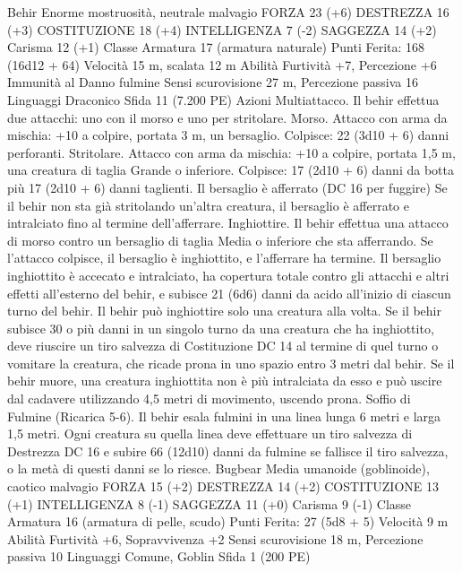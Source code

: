 \begin{multicols}{2}
Behir
Enorme mostruosità, neutrale malvagio
FORZA 23 (+6)
DESTREZZA 16 (+3)
COSTITUZIONE 18 (+4)
INTELLIGENZA 7 (-2)
SAGGEZZA 14 (+2)
Carisma 12 (+1)
Classe Armatura 17 (armatura naturale)
\hspace*{0pt}\hfill{Punti Ferita}: 168 (16d12 + 64)
Velocità 15 m, scalata 12 m
Abilità Furtività +7, Percezione +6
Immunità al Danno fulmine
Sensi scurovisione 27 m, Percezione passiva 16
Linguaggi Draconico
Sfida 11 (7.200 PE)
Azioni
Multiattacco. Il behir effettua due attacchi: uno con il morso e
uno per stritolare.
Morso. Attacco con arma da mischia: +10 a colpire, portata 3 m,
un bersaglio.
Colpisce: 22 (3d10 + 6) danni perforanti.
Stritolare. Attacco con arma da mischia: +10 a colpire, portata
1,5 m, una creatura di taglia Grande o inferiore.
Colpisce: 17 (2d10 + 6) danni da botta più 17 (2d10 + 6)
danni taglienti. Il bersaglio è afferrato (DC 16 per fuggire) Se il
behir non sta già stritolando un’altra creatura, il bersaglio è
afferrato e intralciato fino al termine dell’afferrare.
Inghiottire. Il behir effettua una attacco di morso contro un
bersaglio di taglia Media o inferiore che sta afferrando. Se
l’attacco colpisce, il bersaglio è inghiottito, e l’afferrare ha
termine. Il bersaglio inghiottito è accecato e intralciato, ha
copertura totale contro gli attacchi e altri effetti all’esterno del
behir, e subisce 21 (6d6) danni da acido all’inizio di ciascun
turno del behir. Il behir può inghiottire solo una creatura alla
volta.
Se il behir subisce 30 o più danni in un singolo turno da una
creatura che ha inghiottito, deve riuscire un tiro salvezza di
Costituzione DC 14 al termine di quel turno o vomitare la
creatura, che ricade prona in uno spazio entro 3 metri dal behir.
Se il behir muore, una creatura inghiottita non è più intralciata da
esso e può uscire dal cadavere utilizzando 4,5 metri di
movimento, uscendo prona.
Soffio di Fulmine (Ricarica 5-6). Il behir esala fulmini in una
linea lunga 6 metri e larga 1,5 metri. Ogni creatura su quella
linea deve effettuare un tiro salvezza di Destrezza DC 16 e subire
66 (12d10) danni da fulmine se fallisce il tiro salvezza, o la metà
di questi danni se lo riesce.
Bugbear
Media umanoide (goblinoide), caotico malvagio
FORZA 15 (+2)
DESTREZZA 14 (+2)
COSTITUZIONE 13 (+1)
INTELLIGENZA 8 (-1)
SAGGEZZA 11 (+0)
Carisma 9 (-1)
Classe Armatura 16 (armatura di pelle, scudo)
\hspace*{0pt}\hfill{Punti Ferita}: 27 (5d8 + 5)
Velocità 9 m
Abilità Furtività +6, Sopravvivenza +2
Sensi scurovisione 18 m, Percezione passiva 10
Linguaggi Comune, Goblin
Sfida 1 (200 PE)

\end{multicols}
